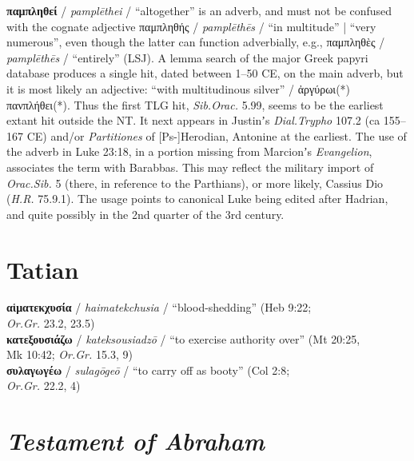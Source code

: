 \noindent{}\textbf{παμπληθεί} / \textit{pamplēthei} / “altogether” %
is an adverb, and must not be confused with the cognate adjective παμπληθής / \textit{pamplēthēs} / “in multitude” | “very numerous”, %
even though the latter can function adverbially, e.g., παμπληθὲς / \textit{pamplēthēs} / “entirely” (LSJ). %
A lemma search of the major Greek papyri database produces a single hit, dated between 1--50 CE, on the main adverb, %
but it is most likely an adjective: “with multitudinous silver” / ἀργύρωι(*) πανπλήθει(*). %
Thus the first TLG hit, \textit{Sib.Orac.} 5.99, seems to be the earliest extant hit outside the NT. %
It next appears in Justinʼs \textit{Dial.Trypho} 107.2 (ca 155--167 CE) %
and/or \textit{Partitiones} of [Ps-]Herodian, %
Antonine at the earliest. The use of the adverb in Luke 23:18, in a portion missing from Marcionʼs \textit{Evangelion}, %
associates the term with Barabbas. This may reflect the military import of \textit{Orac.Sib.} 5 %
(there, in reference to the Parthians), or more likely, Cassius Dio (\textit{H.R.} 75.9.1). %
The usage points to canonical Luke being edited after Hadrian, %
and quite possibly in the 2nd quarter of the 3rd century. \\[0.4mm] %

\section{Tatian}

\noindent{}\textbf{αἱματεκχυσία} / \textit{haimatekchusia} / %
“blood-shedding” (Heb 9:22; \\ %
 \makebox[3em][l]{} \textit{Or.Gr.} 23.2, 23.5) \\[0.4mm] %
\noindent{}\textbf{κατεξουσιάζω} / \textit{kateksousiadzō} / “to exercise authority over” (Mt 20:25, \\ %
 \makebox[3em][l]{} Mk 10:42; \textit{Or.Gr.} 15.3, 9) \\[0.4mm] %
 \noindent{}\textbf{συλαγωγέω} / \textit{sulagōgeō} / “to carry off as booty” (Col 2:8; %
 \\\makebox[3em][l]{}\textit{Or.Gr.} 22.2, 4) \\[0.4mm] %

\section{\textit{Testament of Abraham}}%


